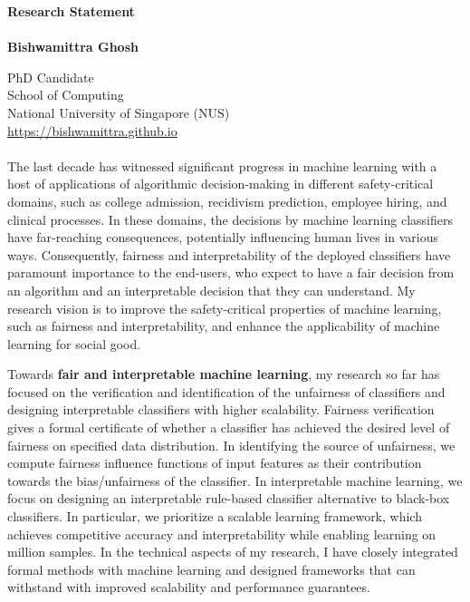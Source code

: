 \documentclass[11pt]{article}
\begin{document}
	\noindent\huge \textbf{Research Statement} \\
	\vspace{0.1em}\\
	\Large \textbf{Bishwamittra Ghosh}
		
	\normalsize
	\noindent PhD Candidate\\
	School of Computing\\
	National University of Singapore (NUS)\\
	\url{https://bishwamittra.github.io}



	\paragraph{}
	The last decade has witnessed significant progress in machine learning with a host of applications of algorithmic decision-making in different safety-critical domains, such as college admission, recidivism prediction, employee hiring, and clinical processes. In these domains, the decisions by machine learning classifiers have far-reaching consequences, potentially influencing human lives in various ways. Consequently, fairness and interpretability of the deployed classifiers have paramount importance to the end-users, who expect to have a fair decision from an algorithm and an interpretable decision that they can understand. My research vision is to improve the safety-critical properties of machine learning, such as fairness and interpretability, and enhance the applicability of machine learning for social good. 
	
	
	Towards \textbf{fair and interpretable machine learning}, my research so far has focused on the verification and identification of the unfairness of classifiers and designing interpretable classifiers with higher scalability. Fairness verification gives a formal certificate of whether a classifier has achieved the desired level of fairness on specified data distribution. In identifying the source of unfairness, we compute fairness influence functions of input features as their contribution towards the bias/unfairness of the classifier. In interpretable machine learning, we focus on designing an interpretable rule-based classifier alternative to black-box classifiers. In particular, we prioritize a scalable learning framework, which achieves competitive accuracy and interpretability while enabling learning on million samples. In the technical aspects of my research, I have closely integrated formal methods with machine learning and designed frameworks that can withstand with improved scalability and performance guarantees.
	
	
%	
%	
\end{document}
